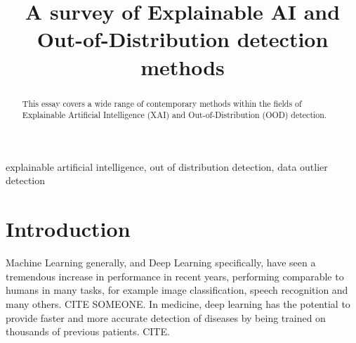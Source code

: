 \documentclass[conference]{IEEEtran}
\begin{document}
\title{A survey of Explainable AI and Out-of-Distribution detection methods}
\thispagestyle{plain}
\pagestyle{plain}

\author{
}

\maketitle




\begin{abstract}


This essay covers a wide range of contemporary methods within the fields of Explainable Artificial Intelligence (XAI) and Out-of-Distribution (OOD) detection.
\end{abstract}

\begin{IEEEkeywords}
explainable artificial intelligence, out of distribution detection, data outlier detection
\end{IEEEkeywords}

\section{Introduction}

Machine Learning generally, and Deep Learning specifically, have seen a tremendous increase in performance in recent years, performing comparable to humans in many tasks, for example image classification, speech recognition and many others. CITE SOMEONE. In medicine, deep learning has the potential to provide faster and more accurate detection of diseases by being trained on thousands of previous patients. CITE.
\end{document}
